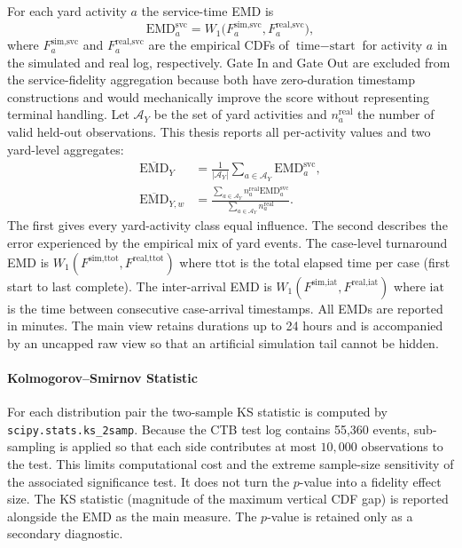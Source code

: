 For each yard activity $a$ the service-time EMD is
\begin{equation}
    \text{EMD}_a^{\text{svc}} = W_1
    \bigl(F_{a}^{\text{sim,svc}}, F_{a}^{\text{real,svc}}\bigr),
\end{equation}
where $F_{a}^{\text{sim,svc}}$ and $F_{a}^{\text{real,svc}}$ are the
empirical CDFs of $\text{time}-\text{start}$ for activity $a$ in the
simulated and real log, respectively. Gate In and Gate Out are excluded
from the service-fidelity aggregation because both have zero-duration
timestamp constructions and would mechanically improve the score without
representing terminal handling. Let $\mathcal A_Y$ be the set of yard
activities and $n_a^{\mathrm{real}}$ the number of valid held-out
observations. This thesis reports all per-activity values and two yard-level
aggregates:
\begin{align}
 \overline{\mathrm{EMD}}_{Y}
   &= \frac{1}{|\mathcal A_Y|}\sum_{a\in\mathcal A_Y}
      \mathrm{EMD}^{\mathrm{svc}}_a,\\
 \overline{\mathrm{EMD}}_{Y,w}
   &= \frac{\sum_{a\in\mathcal A_Y} n_a^{\mathrm{real}}
      \mathrm{EMD}^{\mathrm{svc}}_a}
      {\sum_{a\in\mathcal A_Y} n_a^{\mathrm{real}}}.
\end{align}
The first gives every yard-activity class equal influence. The second
describes the error experienced by the empirical mix of yard events. The
case-level turnaround EMD
is $W_1(F^{\text{sim,ttot}}, F^{\text{real,ttot}})$ where
$\text{ttot}$ is the total elapsed time per case (first start to last
complete). The inter-arrival EMD is
$W_1(F^{\text{sim,iat}}, F^{\text{real,iat}})$ where
$\text{iat}$ is the time between consecutive case-arrival timestamps.
All EMDs are reported in minutes. The main view retains durations up to
24 hours and is accompanied by an uncapped raw view so that an artificial
simulation tail cannot be hidden.

\paragraph{Kolmogorov--Smirnov Statistic}

For each distribution pair the two-sample KS statistic is computed by
\texttt{scipy.stats.ks\_2samp}. Because the CTB test log contains 55,360
events, sub-sampling is applied so that each side contributes at most
$10{,}000$ observations to the test. This limits computational cost and
the extreme sample-size sensitivity of the associated significance test.
It does not turn the $p$-value into a fidelity effect size. The KS
statistic (magnitude of the maximum vertical CDF gap) is reported
alongside the EMD as the main measure. The $p$-value is retained
only as a secondary diagnostic.

